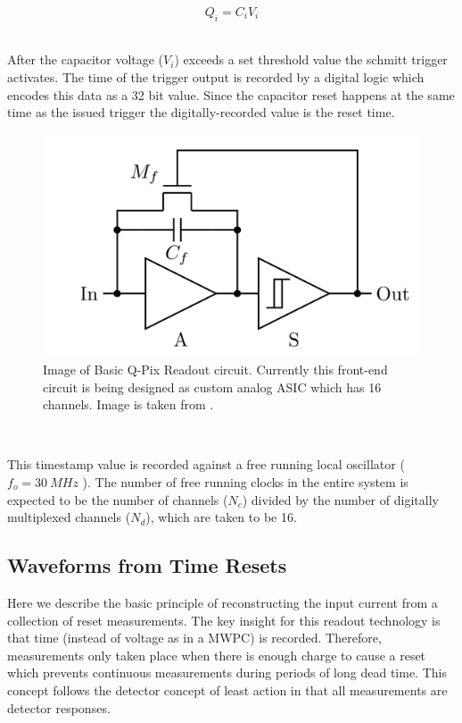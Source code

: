 
\begin{equation}
Q_{i} = C_{i}V_{i}
\end{equation}
~\label{eq:capacitor}

After the capacitor voltage ($V_{i}$) exceeds a set threshold value the schmitt trigger activates.
The time of the trigger output is recorded by a digital logic which encodes this data as a 32 bit value.
Since the capacitor reset happens at the same time as the issued trigger the digitally-recorded value is the reset time.

\begin{figure}[]
\centering
\includegraphics[width=\textwidth]{images/qpix_circuit.jpg}
\caption{Image of Basic Q-Pix Readout circuit. Currently this front-end circuit is being designed as custom analog ASIC which has 16 channels. Image is taken from \citep{qpix:nygren:mei}.}
\end{figure}
~\label{fig:qpixCircuit}

This timestamp value is recorded against a free running local oscillator ($f_{o} = 30~\unit{MHz}$ ).
The number of free running clocks in the entire system is expected to be the number of channels ($N_{c}$) divided by the number of digitally multiplexed channels ($N_{d}$), which are taken to be 16.

\subsection{Waveforms from Time Resets}

Here we describe the basic principle of reconstructing the input current from a collection of reset measurements.
The key insight for this readout technology is that time (instead of voltage as in a MWPC) is recorded.
Therefore, measurements only taken place when there is enough charge to cause a reset which prevents continuous measurements during periods of long dead time.
This concept follows the detector concept of least action in that all measurements are detector responses.

